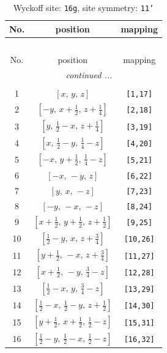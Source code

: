 \documentclass[fleqn,8pt]{jsarticle}
\begin{document}
\begin{longtable}{ccc}
\caption{Wyckoff site: {\tt 16g}, site symmetry: {\tt 11'}}
 \\
 \hline \hline
No. & position & mapping \\ \hline \endfirsthead

\multicolumn{2}{l}{\tablename\ \thetable{}} \\
 \hline \hline
No. & position & mapping \\ \hline \endhead

 \hline \hline
\multicolumn{2}{r}{\footnotesize\it continued ...} \\ \endfoot

 \hline \hline
\multicolumn{2}{r}{} \\ \endlastfoot

1 & $\left[ x,\, y,\, z \right]$ & {\tt [1,17]} \\ \hline
2 & $\left[ - y,\, x + \frac{1}{2},\, z + \frac{1}{4} \right]$ & {\tt [2,18]} \\ \hline
3 & $\left[ y,\, \frac{1}{2} - x,\, z + \frac{1}{4} \right]$ & {\tt [3,19]} \\ \hline
4 & $\left[ x,\, \frac{1}{2} - y,\, \frac{1}{4} - z \right]$ & {\tt [4,20]} \\ \hline
5 & $\left[ - x,\, y + \frac{1}{2},\, \frac{1}{4} - z \right]$ & {\tt [5,21]} \\ \hline
6 & $\left[ - x,\, - y,\, z \right]$ & {\tt [6,22]} \\ \hline
7 & $\left[ y,\, x,\, - z \right]$ & {\tt [7,23]} \\ \hline
8 & $\left[ - y,\, - x,\, - z \right]$ & {\tt [8,24]} \\ \hline
9 & $\left[ x + \frac{1}{2},\, y + \frac{1}{2},\, z + \frac{1}{2} \right]$ & {\tt [9,25]} \\ \hline
10 & $\left[ \frac{1}{2} - y,\, x,\, z + \frac{3}{4} \right]$ & {\tt [10,26]} \\ \hline
11 & $\left[ y + \frac{1}{2},\, - x,\, z + \frac{3}{4} \right]$ & {\tt [11,27]} \\ \hline
12 & $\left[ x + \frac{1}{2},\, - y,\, \frac{3}{4} - z \right]$ & {\tt [12,28]} \\ \hline
13 & $\left[ \frac{1}{2} - x,\, y,\, \frac{3}{4} - z \right]$ & {\tt [13,29]} \\ \hline
14 & $\left[ \frac{1}{2} - x,\, \frac{1}{2} - y,\, z + \frac{1}{2} \right]$ & {\tt [14,30]} \\ \hline
15 & $\left[ y + \frac{1}{2},\, x + \frac{1}{2},\, \frac{1}{2} - z \right]$ & {\tt [15,31]} \\ \hline
16 & $\left[ \frac{1}{2} - y,\, \frac{1}{2} - x,\, \frac{1}{2} - z \right]$ & {\tt [16,32]} \\
\end{longtable}
\end{document}
